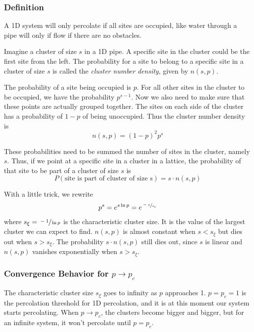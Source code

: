 \documentclass[11pt]{article}
\numberwithin{equation}{section}
\numberwithin{figure}{section}
\newcommand{\ita}[1]{\textit{#1}}
\begin{document}
\subsubsection{Definition}
A 1D system will only percolate if all sites are occupied,
like water through a pipe will only if flow if there are no 
obstacles. 

Imagine a cluster of size $s$ in a 1D pipe.
A specific site in the cluster could be the first site from 
the left. The probability for a site to belong to a
specific site in a cluster of size $s$ is called the
\ita{cluster number density}, given by $n(s,p)$.

The probability of a site being occupied is $p$.
For all other sites in the cluster to be occupied, we have
the probability $p^{s-1}$. Now we also need to make sure that
these points are actually grouped together. The sites on each side of
the cluster has a probability of $1-p$ of being unoccupied.
Thus the cluster number density is
\begin{equation}
    n(s,p) = {(1-p)}^2 p^s
\end{equation}

These probabilities need to be summed the number of sites
in the cluster, namely $s$. 
Thus, if we point at a specific site in a cluster in a lattice, the
probability of that site to be part of a cluster of size $s$ is
\begin{equation}
    P(\text{site is part of cluster of size s}) = s\cdot n(s,p)
\end{equation}

With a little trick, we rewrite
\begin{equation}
    p^s = e^{s\ln p} = e^{\sfrac{-s}{s_{\xi}}}
\end{equation}
where $s_{\xi} = \sfrac{-1}{\ln p}$ 
is the characteristic cluster size.
It is the value of the largest cluster we can expect to find.
$n(s,p)$ is almost constant when $s < s_{\xi}$ but dies
out when $s > s_{\xi}$.
The probability $s\cdot n(s,p)$ still dies out, since
$s$ is linear and $n(s,p)$ vanishes exponentially when $s > s_\xi$.

\subsubsection{Convergence Behavior for $p\rightarrow p_c$}

The characteristic cluster size $s_\xi$ 
goes to infinity as $p$ approaches 1.
$p = p_c = 1$ is the percolation threshold for
1D percolation, and it is at this moment our system starts
percolating. When $p\rightarrow p_c$, the clusters
become bigger and bigger, but for an infinite system,
it won't percolate until $p=p_c$.
\end{document}
